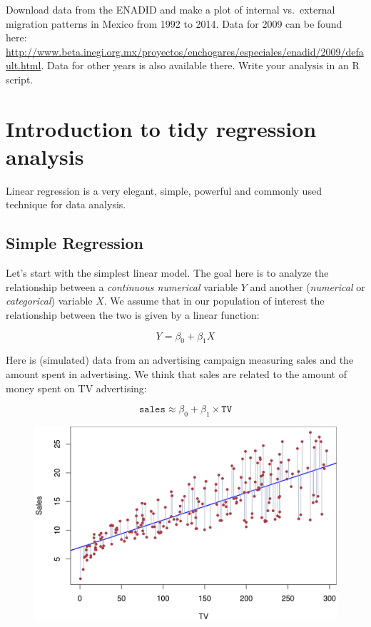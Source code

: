 \documentclass[12pt,]{book}
\theoremstyle{definition}
\theoremstyle{definition}
\theoremstyle{definition}
\theoremstyle{remark}
\begin{document}
Download data from the ENADID and make a plot of internal vs.~external
migration patterns in Mexico from 1992 to 2014. Data for 2009 can be
found here:
\url{http://www.beta.inegi.org.mx/proyectos/enchogares/especiales/enadid/2009/default.html}.
Data for other years is also available there. Write your analysis in an
R script.

\chapter{Introduction to tidy regression
analysis}\label{introduction-to-tidy-regression-analysis}

Linear regression is a very elegant, simple, powerful and commonly used
technique for data analysis.

\section{Simple Regression}\label{simple-regression}

Let's start with the simplest linear model. The goal here is to analyze
the relationship between a \emph{continuous numerical} variable \(Y\)
and another (\emph{numerical} or \emph{categorical}) variable \(X\). We
assume that in our population of interest the relationship between the
two is given by a linear function:

\[
Y = \beta_0 + \beta_1 X
\]

Here is (simulated) data from an advertising campaign measuring sales
and the amount spent in advertising. We think that sales are related to
the amount of money spent on TV advertising:

\[
\mathtt{sales} \approx \beta_0 + \beta_1 \times \mathtt{TV}
\]

\begin{figure}
\centering
\includegraphics{img/regression_example.png}
\caption{}
\end{figure}
\end{document}
